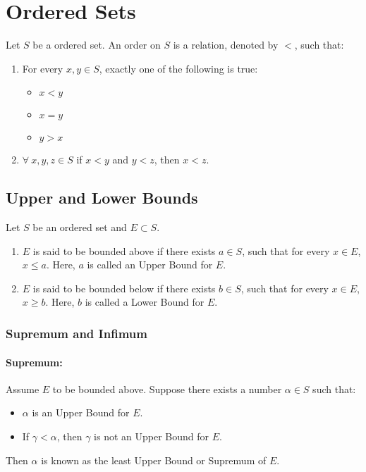 \documentclass[12pt, oneside]{book}
\begin{document}
\section{Ordered Sets}
Let \(S\) be a ordered set.
An order on \(S\) is a relation, denoted by \(<\), such that:
\begin{enumerate}
	\item For every \(x,y \in S\), exactly one of the following is true:
	      \begin{itemize}
		      \item \(x < y\)
		      \item \(x = y\)
		      \item \(y > x\)
	      \end{itemize}
	\item \(\forall \: x,y,z \in S\) if \(x < y\) and \(y < z\), then \(x < z\).
\end{enumerate}

\subsection{Upper and Lower Bounds}
Let \(S\) be an ordered set and \(E \subset S\).
\begin{enumerate}
	\item \(E\) is said to be bounded above if there exists \( a \in S \), such that for every \( x \in E \), \( x \leq a \). Here, \(a\) is called an Upper Bound for \(E\).
	\item \(E\) is said to be bounded below if there exists \( b \in S \), such that for every \( x \in E \), \( x \geq b \). Here, \(b\) is called a Lower Bound for \(E\).
\end{enumerate}

\subsubsection{Supremum and Infimum}
\paragraph{Supremum:} Assume \(E\) to be bounded above.
Suppose there exists a number \(\alpha \in S\) such that:
\begin{itemize}
	\item \(\alpha\) is an Upper Bound for \(E\).
	\item If \(\gamma < \alpha\), then \(\gamma\) is not an Upper Bound for \(E\).
\end{itemize}
Then \( \alpha \) is known as the least Upper Bound or Supremum of \(E\).
\end{document}
